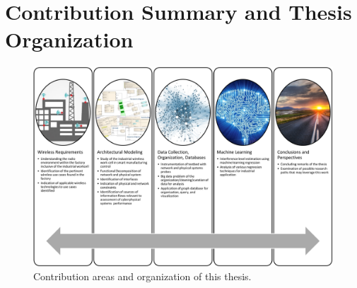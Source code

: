 %
%
%
%
%
%
%
%

\section{Contribution Summary and Thesis Organization}

\begin{figure}[!tbhp]
	\includegraphics{chapter-intro/images/contributions}
	\caption{Contribution areas and organization of this thesis.}
	\label{fig:intro:contr-org}
\end{figure}


